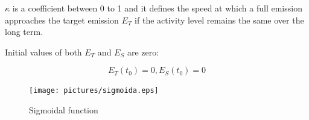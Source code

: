 \documentclass[a4paper,12pt]{article}
\begin{document}
$\kappa$ is a coefficient between 0 to 1 and it defines the speed at which a full emission approaches the target emission $E_T$ if the activity level remains the same over the long term.


Initial values of both $E_T$ and $E_S$ are zero:


$$
E_T(t_0)=0, E_S(t_0)=0
$$


\begin{figure}[h]
      \texttt{[image: pictures/sigmoida.eps]}
      \caption{Sigmoidal function}
      \label{fig:sigmoida}
\end{figure}
\end{document}
